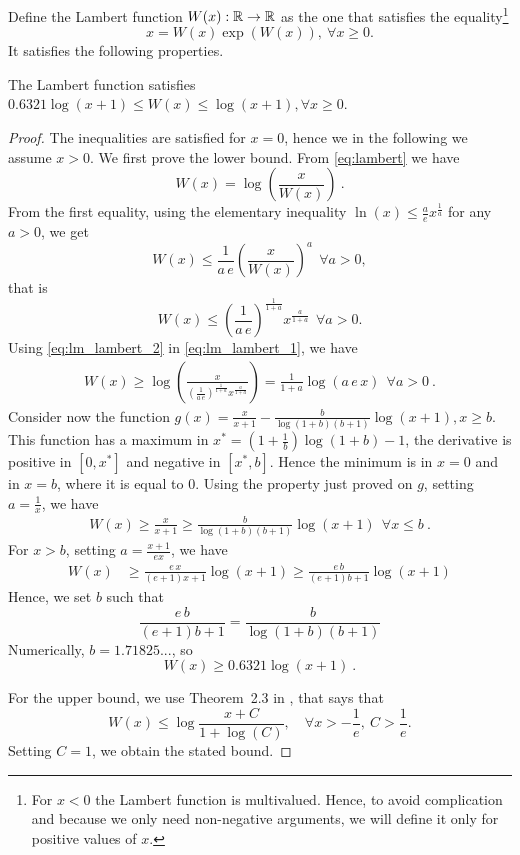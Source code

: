 Define the Lambert function $W(x):\mathbb{R}\rightarrow\mathbb{R}$ as the one that satisfies
the equality\footnote{For $x<0$ the Lambert function is multivalued. Hence, to
avoid complication and because we only need non-negative arguments, we will
define it only for positive values of $x$.}
\begin{equation}
\label{eq:lambert}
x=W(x) \exp \left(W(x)\right), \ \forall x\geq0.
\end{equation}
It satisfies the following properties.
%
\begin{lemma}
\label{lemma:lambert}
The Lambert function satisfies $0.6321 \log(x+1) \leq W(x) \leq \log(x+1), \forall x\geq0$.
\end{lemma}
%
\begin{proof}
The inequalities are satisfied for $x=0$, hence we in the following we assume $x>0$.
We first prove the lower bound. From \eqref{eq:lambert} we have
\begin{equation}
W(x) = \log\left(\frac{x}{W(x)}\right)~. \label{eq:lm_lambert_1}
\end{equation}
From the first equality, using the elementary inequality $\ln (x) \leq \frac{a}{e} x^\frac{1}{a}$ for any $a>0$, we get
\[
W(x) \leq \frac{1}{a\, e}\left(\frac{x}{W(x)}\right)^a  \ \ \forall a>0,
\]
that is
\begin{equation}
\label{eq:lm_lambert_2}
W(x) \leq \left(\frac{1}{a\, e}\right)^\frac{1}{1+a} x^\frac{a}{1+a} \ \ \forall a>0.
\end{equation}
Using \eqref{eq:lm_lambert_2} in \eqref{eq:lm_lambert_1}, we have
\begin{align*}
W(x)
\geq \log\left(\frac{x}{\left(\frac{1}{a\, e}\right)^\frac{1}{1+a} x^\frac{a}{1+a}}\right)
= \frac{1}{1+a}\log\left(a \, e\, x\right) \ \ \forall a>0~.
\end{align*}
Consider now the function $g(x)=\frac{x}{x+1} - \frac{b}{\log(1+b) (b+1)}
\log(x+1), x\geq b$. This function has a maximum in $x^*=(1+\frac{1}{b})
\log(1+b)-1$, the derivative is positive in $[0,x^*]$ and negative in
$[x^*,b]$. Hence the minimum is in $x=0$ and in $x=b$, where it is equal to
$0$.  Using the property just proved on $g$, setting $a=\frac{1}{x}$, we have
\begin{align*}
W(x)
\geq \frac{x}{x+1} \geq \frac{b}{\log(1+b) (b+1)} \log(x+1) \ \  \forall x\leq b~.
\end{align*}
For $x>b$, setting $a=\frac{x+1}{e x}$, we have
\begin{align}
W(x)
&\geq \frac{e\,x}{(e+1) x + 1} \log(x+1) \geq \frac{e\,b}{(e+1) b + 1} \log(x+1)
\end{align}
Hence, we set $b$ such that
\[
\frac{e\, b}{(e+1)b + 1} = \frac{b}{\log(1+b) (b+1)}
\]
Numerically, $b=1.71825...$, so
\[
W(x) \geq 0.6321 \log(x+1)~.
\]

For the upper bound, we use Theorem~2.3 in \cite{hoorfar2008inequalities}, that says that
\[
W(x) \leq \log\frac{x+C}{1+\log(C)}, \quad \forall x> -\frac{1}{e}, \ C>\frac{1}{e}.
\]
Setting $C=1$, we obtain the stated bound.
\end{proof}

